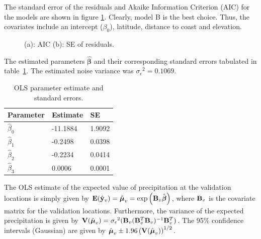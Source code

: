 \documentclass[a4paper,10pt]{article}
\def\bB{{\bf B}}
\def\bE{{\bf E}}
\def\bV{{\bf V}}
\def\by{{\bf y}}
\def\bbeta{{\boldsymbol \beta}}
\def\bmu{{\boldsymbol \mu}}
\def\sigmaeps{{\sigma_{\epsilon}}}
\begin{document}
The standard error of the residuals and Akaike Information Criterion (AIC) for the models are shown in figure \ref{fig:aicse}. Clearly, model B is the best choice. Thus, the covariates include an intercept ($\beta_0$), latitude, distance to coast and elevation.
\begin{figure}[ht]
\centering
  \qquad
  \caption{(a): AIC (b): SE of residuals.}
\label{fig:aicse}
\end{figure}

The estimated parameters $\hat \bbeta$ and their corresponding standard errors tabulated in table~\ref{tab:olsparest}. The estimated noise variance was $\sigmaeps^2 = 0.1069$.
\begin{table}[H]
\centering
\begin{tabular}{lll}
\hline
{\bf Parameter} & {\bf Estimate} & {\bf SE} \\
\hline
$\hat \beta_0$ & -11.1884 & 1.9092 \\
$\hat \beta_1$ & -0.2498 & 0.0398 \\
$\hat \beta_2$ & -0.2234 & 0.0414 \\
$\hat \beta_3$ & 0.0006 & 0.0001 \\
\hline
\end{tabular}
\caption{OLS parameter estimate and standard errors.}
\label{tab:olsparest}
\end{table}

The OLS estimate of the expected value of precipitation at the validation locations is simply given by $\bE(\hat \by_v) = \hat \bmu_v = \exp \left( \bB_v \hat \bbeta \right)$, where $\bB_v$ is the covariate matrix for the validation locations. Furthermore, the variance of the expected precipitation is given by $\bV(\hat \bmu_v) = \sigmaeps^2 (\bB_v (\bB_v^T\bB_v)^{-1} \bB_v^T)$. The 95\% confidence intervals (Gaussian) are given by $\hat \bmu_v \pm 1.96 \left( \bV(\hat \bmu_v) \right)^{1/2}$.
\end{document}
